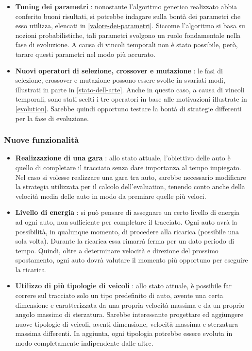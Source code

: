\documentclass[a4paper,12pt]{article}
\begin{document}
\begin{itemize}
	\item \textbf{Tuning dei parametri} : nonostante l'algoritmo genetico realizzato abbia conferito buoni risultati, si potrebbe indagare sulla bontà dei parametri che esso utilizza, elencati in \autoref{valore-dei-parametri}. Siccome l'algoritmo si basa su nozioni probabilistiche, tali parametri svolgono un ruolo fondamentale nella fase di evoluzione. A causa di vincoli temporali non è stato possibile, però, tarare questi parametri nel modo più accurato.
	\item \textbf{Nuovi operatori di selezione, crossover e mutazione} : le fasi di selezione, crossover e mutazione possono essere svolte in svariati modi, illustrati in parte in \autoref{stato-dell-arte}. Anche in questo caso, a causa di vincoli temporali, sono stati scelti i tre operatori in base alle motivazioni illustrate in \autoref{evolution}. Sarebbe quindi opportuno testare la bontà di strategie differenti per la fase di evoluzione.
\end{itemize}
 

\subsubsection*{Nuove funzionalità}

\begin{itemize}
	\item \textbf{Realizzazione di una gara} : allo stato attuale, l'obiettivo delle auto è quello di completare il tracciato senza dare importanza al tempo impiegato. Nel caso si volesse realizzare una gara tra auto, sarebbe necessario modificare la strategia utilizzata per il calcolo dell'evaluation, tenendo conto anche della velocità media delle auto in modo da premiare quelle più veloci.
	\item \textbf{Livello di energia} : si può pensare di assegnare un certo livello di energia ad ogni auto, non sufficiente per completare il tracciato. Ogni auto avrà la possibilità, in qualunque momento, di procedere alla ricarica (possibile una sola volta). Durante la ricarica essa rimarrà ferma per un dato periodo di tempo. Quindi, oltre a determinare velocità e direzione del prossimo spostamento, ogni auto dovrà valutare il momento più opportuno per eseguire la ricarica.
	\item \textbf{Utilizzo di più tipologie di veicoli} : allo stato attuale, è possibile far correre sul tracciato solo un tipo predefinito di auto, avente una certa dimensione e caratterizzata da una propria velocità massima e da un proprio angolo massimo di sterzatura. Sarebbe interessante progettare ed aggiungere nuove tipologie di veicoli, aventi dimensione, velocità massima e sterzatura massima differenti. In aggiunta, ogni tipologia potrebbe essere evoluta in modo completamente indipendente dalle altre. 
\end{itemize}
\end{document}

